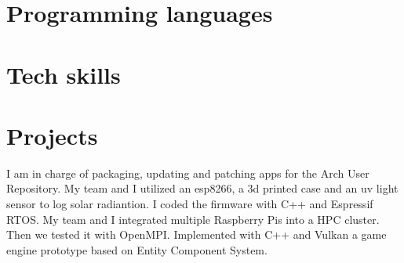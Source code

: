 \documentclass[10pt, a4paper]{moderncv}
\begin{document}
\section{Programming languages}

\section{Tech skills}

\section{Projects}
{
	I am in charge of packaging, updating and patching apps for the Arch User Repository.
}
{
	My team and I utilized an esp8266, a 3d printed case and an uv light sensor to log solar radiantion. I coded the firmware with C++ and Espressif RTOS.
}
{
	My team and I integrated multiple Raspberry Pis into a HPC cluster.
	Then we tested it with OpenMPI.
}
{
	Implemented with C++ and Vulkan a game engine prototype based on Entity Component System.
}


\end{document}
